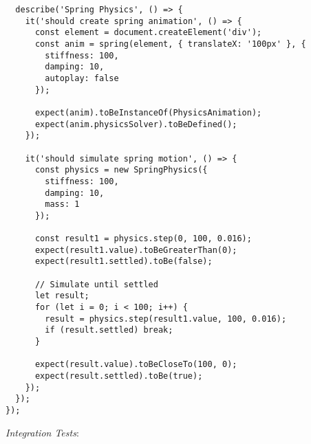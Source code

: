 \documentclass[11pt]{article}
\begin{document}
\begin{verbatim}
  describe('Spring Physics', () => {
    it('should create spring animation', () => {
      const element = document.createElement('div');
      const anim = spring(element, { translateX: '100px' }, {
        stiffness: 100,
        damping: 10,
        autoplay: false
      });
      
      expect(anim).toBeInstanceOf(PhysicsAnimation);
      expect(anim.physicsSolver).toBeDefined();
    });
    
    it('should simulate spring motion', () => {
      const physics = new SpringPhysics({
        stiffness: 100,
        damping: 10,
        mass: 1
      });
      
      const result1 = physics.step(0, 100, 0.016);
      expect(result1.value).toBeGreaterThan(0);
      expect(result1.settled).toBe(false);
      
      // Simulate until settled
      let result;
      for (let i = 0; i < 100; i++) {
        result = physics.step(result1.value, 100, 0.016);
        if (result.settled) break;
      }
      
      expect(result.value).toBeCloseTo(100, 0);
      expect(result.settled).toBe(true);
    });
  });
});
\end{verbatim}

\emph{Integration Tests}:
\end{document}
